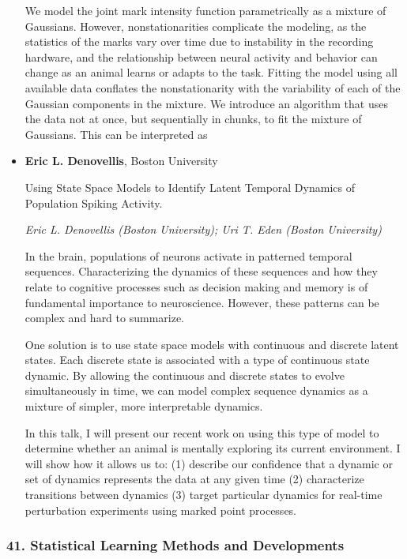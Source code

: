 \begin{itemize}
We model the joint mark intensity function parametrically as a mixture of Gaussians.  However, nonstationarities complicate the modeling, as the statistics of the marks vary over time due to instability in the recording hardware, and the relationship between neural activity and behavior can change as an animal learns or adapts to the task.  Fitting the model using all available data conflates the nonstationarity with the variability of each of the Gaussian components in the mixture.  We introduce an algorithm that uses the data not at once, but sequentially in chunks, to fit the mixture of Gaussians.   This can be interpreted as

\item \textbf{Eric L. Denovellis}, Boston University

Using State Space Models to Identify Latent Temporal Dynamics of Population Spiking Activity.

\emph{\footnotesize Eric L. Denovellis (Boston University); Uri T. Eden (Boston University)}

In the brain, populations of neurons activate in patterned temporal sequences. Characterizing the dynamics of these sequences and how they relate to cognitive processes such as decision making and memory is of fundamental importance to neuroscience. However, these patterns can be complex and hard to summarize.

One solution is to use state space models with continuous and discrete latent states. Each discrete state is associated with a type of continuous state dynamic. By allowing the continuous and discrete states to evolve simultaneously in time, we can model complex sequence dynamics as a mixture of simpler, more interpretable dynamics.

In this talk, I will present our recent work on using this type of model to determine whether an animal is mentally exploring its current environment. I will show how it allows us to: (1) describe our confidence that a dynamic or set of dynamics represents the data at any given time (2) characterize transitions between dynamics (3) target particular dynamics for real-time perturbation experiments using marked point processes.

\end{itemize}

\subsubsection*{41. Statistical Learning Methods and Developments}

